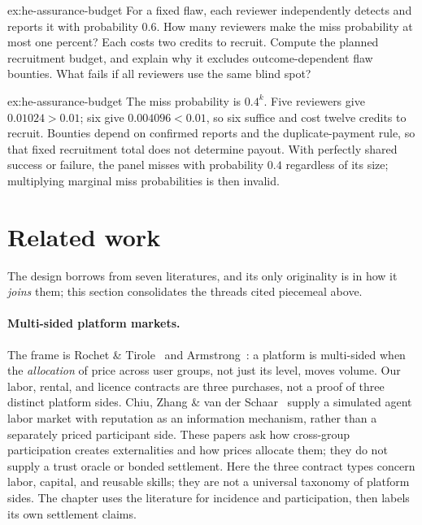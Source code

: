 \documentclass[11pt,a4paper]{article}
\theoremstyle{definition}
\theoremstyle{definition}
\theoremstyle{remark}
\begin{document}
\begin{pdexercise}[kind=Trace,rating=2]{ex:he-assurance-budget}
For a fixed flaw, each reviewer independently detects and reports it with
probability $0.6$. How many reviewers make the miss probability at most one
percent? Each costs two credits to recruit. Compute the planned recruitment
budget, and explain why it excludes outcome-dependent flaw bounties. What
fails if all reviewers use the same blind spot?
\end{pdexercise}
\begin{pdsolution}{ex:he-assurance-budget}
The miss probability is $0.4^k$. Five reviewers give $0.01024>0.01$;
six give $0.004096<0.01$, so six suffice and cost twelve credits to recruit.
Bounties depend on confirmed reports and the duplicate-payment rule, so that
fixed recruitment total does not determine payout. With perfectly shared
success or failure, the panel misses with probability $0.4$ regardless of
its size; multiplying marginal miss probabilities is then invalid.
\end{pdsolution}

\section{Related work}\label{sec:related}

The design borrows from seven literatures, and its only originality is in how it
\emph{joins} them; this section consolidates the threads cited piecemeal above.

\paragraph{Multi-sided platform markets.} The frame is Rochet \&
Tirole~ and Armstrong~: a platform
is multi-sided when the \emph{allocation} of price across user groups, not just its
level, moves volume. Our labor, rental, and licence contracts are three purchases, not a proof of
three distinct platform sides. Chiu, Zhang \& van der Schaar~
supply a simulated agent labor market with reputation as an information
mechanism, rather than a separately priced participant side.
These papers ask how cross-group participation creates externalities and how
prices allocate them; they do not supply a trust oracle or bonded settlement.
Here the three contract types concern labor, capital, and reusable skills;
they are not a universal taxonomy of platform sides. The chapter uses the literature for
incidence and participation, then labels its own settlement claims.
\end{document}
